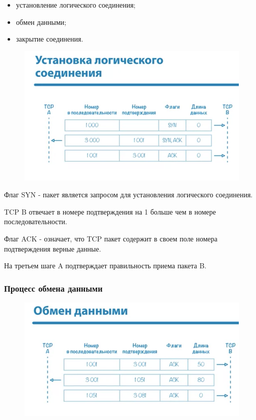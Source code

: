 \documentclass[a4paper,12pt]{article}
\begin{document}
	\begin{itemize}
		\item установление логического соединения;
		\item обмен данными;
		\item закрытие соединения.
	\end{itemize}

	\begin{figure}[h!]
		\begin{center}
			{\includegraphics[scale = 0.8]{7.png}}
			\label{7}
		\end{center}
	\end{figure}

	Флаг SYN - пакет является запросом для установления логического соединения.
	
	TCP B отвечает в номере подтверждения на 1 больше чем в номере последовательности.
	
	Флаг ACK - означает, что TCP пакет содержит в своем поле номера подтверждения верные данные.
	
	На третьем шаге A подтверждает правильность приема пакета B.
	
	\subsubsection{Процесс обмена данными}
	
	\begin{figure}[h!]
		\begin{center}
			{\includegraphics[scale = 1]{8.png}}
			\label{8}
		\end{center}
	\end{figure}
\end{document}
